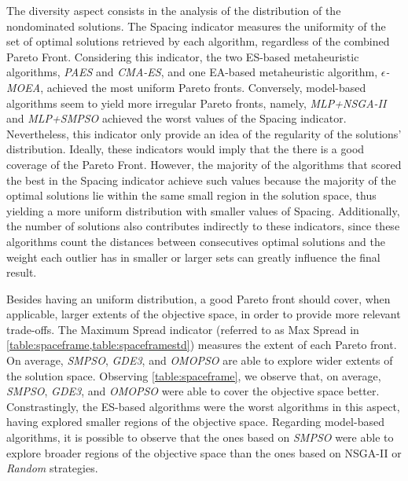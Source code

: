 The diversity aspect consists in the analysis of the distribution of the nondominated solutions. The Spacing indicator measures the uniformity of the set of optimal solutions retrieved by each algorithm, regardless of the combined Pareto Front. Considering this indicator, the two \ac{ES}-based metaheuristic algorithms, \textit{PAES} and \textit{CMA-ES}, and one \ac{EA}-based metaheuristic algorithm, \textit{$\epsilon$-MOEA}, achieved the most uniform Pareto fronts. Conversely, model-based algorithms seem to yield more irregular Pareto fronts, namely, \textit{MLP+NSGA-II} and \textit{MLP+SMPSO} achieved the worst values of the Spacing indicator. Nevertheless, this indicator only provide an idea of the regularity of the solutions' distribution. Ideally, these indicators would imply that the there is a good coverage of the Pareto Front. However, the majority of the algorithms that scored the best in the Spacing indicator achieve such values because the majority of the optimal solutions lie within the same small region in the solution space, thus yielding a more uniform distribution with smaller values of Spacing. Additionally, the number of solutions also contributes indirectly to these indicators, since these algorithms count the distances between consecutives optimal solutions and the weight each outlier has in smaller or larger sets can greatly influence the final result.

Besides having an uniform distribution, a good Pareto front should cover, when applicable, larger extents of the objective space, in order to provide more relevant trade-offs. The Maximum Spread indicator (referred to as Max Spread in \cref{table:spaceframe,table:spaceframestd}) measures the extent of each Pareto front. On average, \textit{SMPSO}, \textit{GDE3}, and \textit{OMOPSO} are able to explore wider extents of the solution space. Observing \cref{table:spaceframe}, we observe that, on average, \textit{SMPSO}, \textit{GDE3}, and \textit{OMOPSO} were able to cover the objective space better. Constrastingly, the \ac{ES}-based algorithms were the worst algorithms in this aspect, having explored smaller regions of the objective space. Regarding model-based algorithms, it is possible to observe that the ones based on \textit{SMPSO} were able to explore broader regions of the objective space than the ones based on \ac{NSGA-II} or \textit{Random} strategies. 

